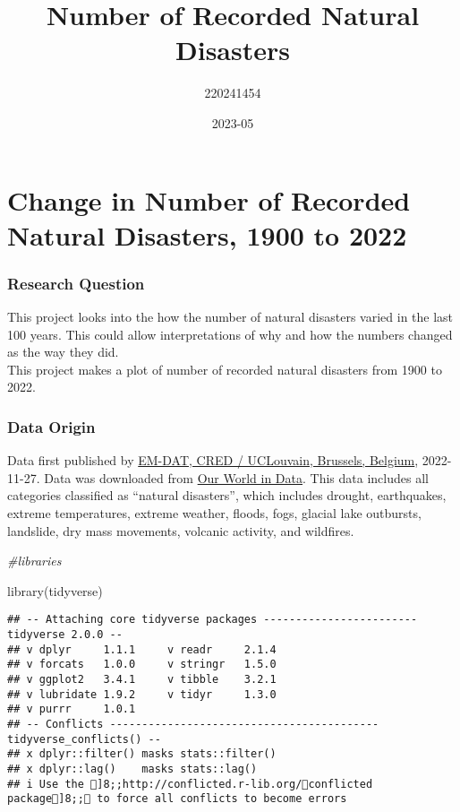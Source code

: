 \documentclass[
]{article}
\title{Number of Recorded Natural Disasters}
\author{220241454}
\date{2023-05}
\newenvironment{Shaded}{\begin{snugshade}}{\end{snugshade}}
\newcommand{\CommentTok}[1]{\textcolor[rgb]{0.56,0.35,0.01}{\textit{#1}}}
\newcommand{\FunctionTok}[1]{\textcolor[rgb]{0.00,0.00,0.00}{#1}}
\newcommand{\NormalTok}[1]{#1}
\begin{document}
\maketitle

\hypertarget{change-in-number-of-recorded-natural-disasters-1900-to-2022}{%
\section{Change in Number of Recorded Natural Disasters, 1900 to
2022}\label{change-in-number-of-recorded-natural-disasters-1900-to-2022}}

\hypertarget{research-question}{%
\subsubsection{Research Question}\label{research-question}}

This project looks into the how the number of natural disasters varied
in the last 100 years. This could allow interpretations of why and how
the numbers changed as the way they did.\\
This project makes a plot of number of recorded natural disasters from
1900 to 2022.

\hypertarget{data-origin}{%
\subsubsection{Data Origin}\label{data-origin}}

Data first published by \href{https://emdat.be/}{EM-DAT, CRED /
UCLouvain, Brussels, Belgium}, 2022-11-27. Data was downloaded from
\href{https://ourworldindata.org/grapher/number-of-natural-disaster-events?time=earliest..latest}{Our
World in Data}. This data includes all categories classified as
``natural disasters'', which includes drought, earthquakes, extreme
temperatures, extreme weather, floods, fogs, glacial lake outbursts,
landslide, dry mass movements, volcanic activity, and wildfires.

\begin{Shaded}
\begin{Highlighting}[]
\CommentTok{\#libraries}

\FunctionTok{library}\NormalTok{(tidyverse)}
\end{Highlighting}
\end{Shaded}

\begin{verbatim}
## -- Attaching core tidyverse packages ------------------------ tidyverse 2.0.0 --
## v dplyr     1.1.1     v readr     2.1.4
## v forcats   1.0.0     v stringr   1.5.0
## v ggplot2   3.4.1     v tibble    3.2.1
## v lubridate 1.9.2     v tidyr     1.3.0
## v purrr     1.0.1     
## -- Conflicts ------------------------------------------ tidyverse_conflicts() --
## x dplyr::filter() masks stats::filter()
## x dplyr::lag()    masks stats::lag()
## i Use the ]8;;http://conflicted.r-lib.org/conflicted package]8;; to force all conflicts to become errors
\end{verbatim}
\end{document}
